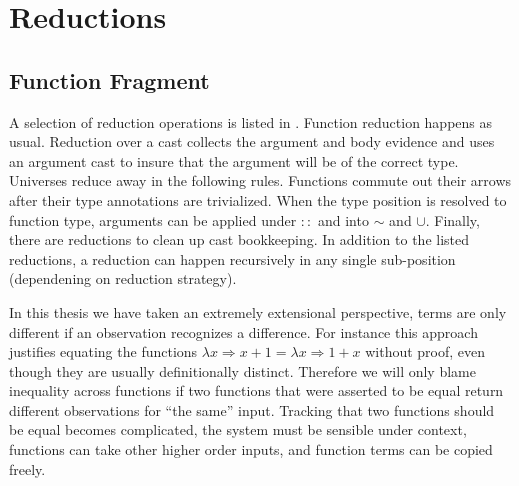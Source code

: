 \section{Reductions}
 
\subsection{Function Fragment}

A selection of reduction operations is listed in .
Function reduction happens as usual.
Reduction over a cast collects the argument and body evidence and uses an argument cast to insure that the argument will be of the correct type.
Universes reduce away in the following rules.
Functions commute out their arrows after their type annotations are trivialized.
When the type position is resolved to function type, arguments can be applied under $::$ and into $\sim$ and $\cup$.
Finally, there are reductions to clean up cast bookkeeping.
In addition to the listed reductions, a reduction can happen recursively in any single sub-position (dependening on reduction strategy).

In this thesis we have taken an extremely extensional perspective, terms are only different if an observation recognizes a difference.
For instance this approach justifies equating the functions $\lambda x\Rightarrow x+1=\lambda x\Rightarrow1+x$ without proof, even though they are usually definitionally distinct.
Therefore we will only blame inequality across functions if two functions that were asserted to be equal return different observations for ``the same'' input.
Tracking that two functions should be equal becomes complicated, the system must be sensible under context, functions can take other higher order inputs, and function terms can be copied freely.


